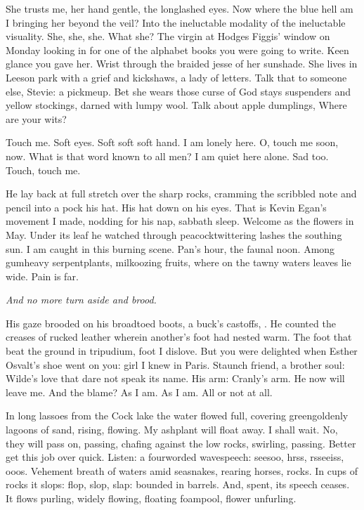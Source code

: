 She trusts me, her hand gentle, the longlashed eyes.
Now where the blue hell am I bringing her beyond the veil?
Into the ineluctable modality
of the ineluctable visuality.
She, she, she.
What she?
The virgin at Hodges Figgis' window on Monday looking in
for one of the alphabet books you were going to write.
Keen glance you gave her.
Wrist through the braided jesse of her sunshade.
She lives in Leeson park with a grief and kickshaws, a lady of letters.
Talk that to someone else,
Stevie:
a pickmeup.
Bet she wears those curse of God stays
suspenders and yellow stockings, darned with lumpy wool.
Talk about apple dumplings,
Where are your wits?

Touch me.
Soft eyes.
Soft soft soft hand.
I am lonely here.
O, touch me soon, now.
What is that word known to all men?
I am quiet here alone.
Sad too.
Touch, touch me.

He lay back at full stretch over the sharp rocks,
cramming the scribbled note and pencil into a pock his hat.
His hat down on his eyes.
That is Kevin Egan's movement I made,
nodding for his nap, sabbath sleep.
Welcome as the flowers in May.
Under its leaf he watched through peacocktwittering lashes
the southing sun.
I am caught in this burning scene.
Pan's hour, the faunal noon.
Among gumheavy serpentplants, milkoozing fruits,
where on the tawny waters leaves lie wide.
Pain is far.

\emph{And no more turn aside and brood.}

His gaze brooded on his broadtoed boots, a buck's castoffs, .
He counted the creases of rucked leather wherein another's foot had nested warm.
The foot that beat the ground in tripudium,
foot I dislove.
But you were delighted when Esther Osvalt's shoe went on you:
girl I knew in Paris.
Staunch friend, a brother soul:
Wilde's love that dare not speak its name.
His arm:
Cranly's arm.
He now will leave me.
And the blame?
As I am.
As I am.
All or not at all.

In long lassoes from the Cock lake
the water flowed full,
covering greengoldenly lagoons of sand,
rising, flowing.
My ashplant will float away.
I shall wait.
No, they will pass on, passing,
chafing against the low rocks, swirling, passing.
Better get this job over quick.
Listen:
a fourworded wavespeech:
seesoo, hrss, rsseeiss, ooos.
Vehement breath of waters
amid seasnakes, rearing horses, rocks.
In cups of rocks it slops:
flop, slop, slap:
bounded in barrels.
And, spent, its speech ceases.
It flows purling,
widely flowing,
floating foampool,
flower unfurling.

